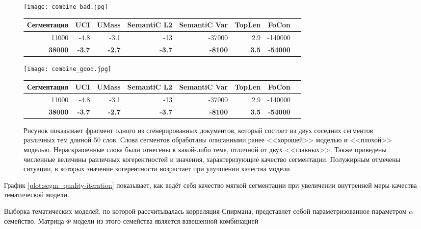 \begin{figure}[hb]

    \centering
    \texttt{[image: combine\_bad.jpg]}

    \scriptsize
    \centering
    \begin{tabular}{rrrrrrrr}
      Сегментация & UCI & UMass & SemantiC L2 & SemantiC Var & TopLen & FoCon\\
      \midrule
      \rowcolor{my-blue-light}
      11000 & -4.8 & -3.1 & -13 & -37000 & 2.9 & -140000\\
      \textbf{38000} & \textbf{-3.7} & \textbf{-2.7} & \textbf{-3.7} & \textbf{-8100} & \textbf{3.5} & \textbf{-54000}
    \end{tabular}

    \centering
    \texttt{[image: combine\_good.jpg]}

    \scriptsize
    \centering
    \begin{tabular}{rrrrrrrr}
      Сегментация & UCI & UMass & SemantiC L2 & SemantiC Var & TopLen & FoCon\\
      \midrule
      11000 & -4.8 & -3.1 & -13 & -37000 & 2.9 & -140000\\
      \rowcolor{my-blue-light}
      \textbf{38000} & \textbf{-3.7} & \textbf{-2.7} & \textbf{-3.7} & \textbf{-8100} & \textbf{3.5} & \textbf{-54000}
    \end{tabular}

    \caption{Рисунок показывает фрагмент одного из сгенерированных документов, который состоит из двух соседних сегментов различных тем длиной 50 слов. Слова сегментов обработаны описанными ранее <<хорошей>> моделью и <<плохой>> моделью. Нераскрашенные слова были отнесены к какой-либо теме, отличной от двух <<главных>>. Также приведены численные величины различных когерентностей и значения, характеризующие качество сегментации. Полужирным отмечены ситуации, в которых значение когерентности возрастает при улучшении качества модели.}
    \label{fig:segm_good_bad}
\end{figure}




График \ref{plot:segm_quality-iteration} показывает, как ведёт себя качество мягкой сегментации при увеличении внутренней меры качества тематической модели.

Выборка тематических моделей, по которой рассчитывалась корреляция Спирмана, представлет собой параметризованное параметром $\alpha$ семейство. Матрица $\Phi$ модели из этого семейства является взвешенной комбинацией

